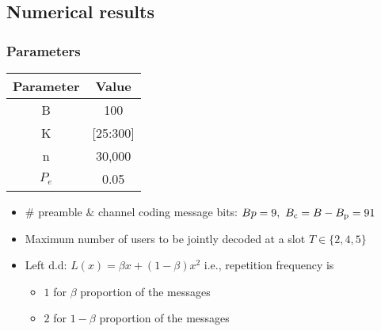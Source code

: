 \subsection{Numerical results}
\begin{frame}\frametitle{Parameters}
\centering
\begin{tabular}{c | c}
Parameter & Value\\
\hline\hline
B & 100\\
K & [25:300]\\
n & 30,000\\
$P_e$ & 0.05\\
\end{tabular}

\pause

\begin{itemize}
\item $\#$ preamble $\&$ channel coding message bits: $Bp=9,~B_{\mathrm{c}}=B-B_{\mathrm{p}}=91$
\item Maximum number of users to be jointly decoded at a slot $T\in\{2,4,5\}$
\item Left d.d: $L(x)=\beta x+(1-\beta)x^2$ i.e., repetition frequency is
\begin{itemize}
	\item  $1$ for $\beta$ proportion of the messages
	\item $2$ for $1-\beta$ proportion of the messages
\end{itemize}
\end{itemize}
\end{frame}

